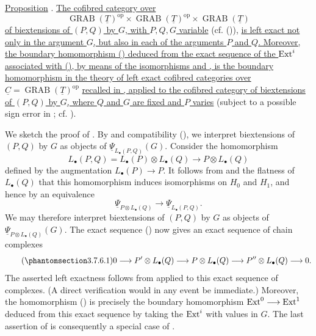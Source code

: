 \underline{Proposition} . \underline{The cofibred category over}
\[
 \operatorname{GRAB}(\underline T)^{\mathrm{op}}
 \times\operatorname{GRAB}(\underline T)^{\mathrm{op}}
 \times\operatorname{GRAB}(\underline T)
\]
\underline{of biextensions of $(P,Q)$ by $G$, with $P,Q,G$
variable} (cf. ()), \underline{is left exact not only in the
argument $G$, but also in each of the arguments $P$ and $Q$.
Moreover, the boundary homomorphism () deduced from the exact
sequence of the $\operatorname{Ext}^i$ associated with (), by means of the
isomorphisms  and , is the boundary homomorphism in the
theory of left exact cofibred categories over}
$\underline C=\operatorname{GRAB}(\underline T)^{\mathrm{op}}$
\underline{recalled in , applied to the cofibred category of
biextensions of $(P,Q)$ by $G$, where $Q$ and $G$ are fixed and $P$
varies} (subject to a possible sign error in ; cf. ).

We sketch the proof of .  By  and compatibility (),
we interpret biextensions of $(P,Q)$ by $G$ as objects of
$\underline\Psi_{L_\bullet(P,Q)}(G)$.  Consider the homomorphism
\[
 L_\bullet(P,Q)
 =L_\bullet(P)\otimes L_\bullet(Q)
 \longrightarrow P\otimes L_\bullet(Q)
\]
defined by the augmentation $L_\bullet(P)\longrightarrow P$.
It follows from  and the flatness of $L_\bullet(Q)$ that this
homomorphism induces isomorphisms on $H_0$ and $H_1$, and hence by
 an equivalence
\[
 \underline\Psi_{P\otimes L_\bullet(Q)}
 \longrightarrow
 \underline\Psi_{L_\bullet(P,Q)}.
\]
We may therefore interpret biextensions of $(P,Q)$ by $G$ as objects
of $\underline\Psi_{P\otimes L_\bullet(Q)}(G)$.  The exact sequence
() now gives an exact sequence of chain complexes
\begin{equation}\tag{\SGARefTarget{sga7.sga7i.evii.n3-7-6-1}{3.7.6.1}}
 0\longrightarrow P'\otimes L_\bullet(Q)
 \longrightarrow P\otimes L_\bullet(Q)
 \longrightarrow P''\otimes L_\bullet(Q)
 \longrightarrow0.
\end{equation}
The asserted left exactness follows from  applied to this exact
sequence of complexes.  (A direct verification would in any event
be immediate.)  Moreover, the homomorphism () is precisely the
boundary homomorphism $\operatorname{Ext}^0\longrightarrow\operatorname{Ext}^1$ deduced from this
exact sequence by taking the $\operatorname{Ext}^i$ with values in $G$.  The last
assertion of  is consequently a special case of .
